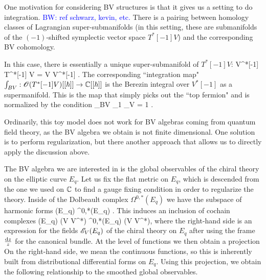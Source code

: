 \documentclass[10pt]{amsart}
\def\brian{\textcolor{blue}{BW: }\textcolor{blue}}
\begin{document}
One motivation for considering BV structures is that it gives us a setting to do integration. \brian{ref schwarz, kevin, etc.}
There is a pairing between homology classes of Lagrangian super-submanifolds (in this setting, these are submanifolds of the $(-1)$-shifted symplectic vector space $T^*[-1] V$) and the corresponding BV cohomology. 

In this case, there is essentially a unique super-submanifold of $T^*[-1] V$:
\ben
V^*[-1] \subset T^*[-1] V = V \oplus V^*[-1] .
\een 
The corresponding ``integration map" $\int_{BV} : \mathscr O(T^*[-1]V)[[\hbar]] \to \mathbb C[[\hbar]]$ is the Berezin integral over $V^*[-1]$ as a supermanifold.
This is the map that simply picks out the ``top fermion" and is normalized by the condition
\ben
\int_{BV} \xi_1 \cdots \xi_{\dim V} = 1 .
\een

Ordinarily, this toy model does not work for BV algebras coming from quantum field theory, as the BV algebra we obtain is not finite dimensional. 
One solution is to perform regularization, but there another approach that allows us to directly apply the discussion above. 

The BV algebra we are interested in is the global observables of the chiral theory on the elliptic curve $E_q$.
Let us fix the flat metric on $E_q$, which is descended from the one we used on $\mathbb C$ to find a gauge fixing condition in order to regularize the theory. 
Inside of the Dolbeault complex $\Omega^{0,*}(E_q)$ we have the subspace of harmonic forms
\ben
\sH(E_q) \subset \Omega^{0,*}(E_q) .
\een 
This induces an inclusion of cochain complexes
\be\label{harmonics}
\sH(E_q) \tensor (V \oplus {} V^*) \hookrightarrow \Omega^{0,*}(E_q) \tensor (V \oplus {} V^*),
\ee
where the right-hand side is an expression for the fields $\mathscr E_V(E_q)$ of the chiral theory on $E_q$ after using the frame $\frac{{\rm d} z}{z}$ for the canonical bundle. 
At the level of functions we then obtain a projection
\ben
{}
\een
On the right-hand side, we mean the continuous functions, so this is inherently built from distributional differential forms on $E_q$. 
Using this projection, we obtain the following relationship to the smoothed global observables.
\end{document}
